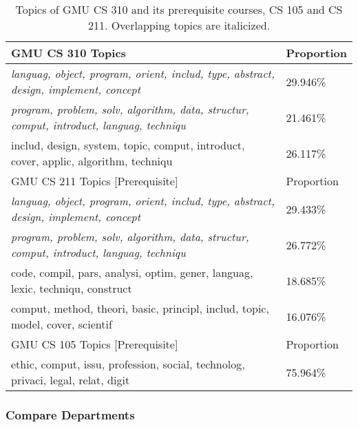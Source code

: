 \begin{table*}[ht!]
  \centering
  \begin{tabular}{ll}
    \toprule
    GMU CS 310 Topics & Proportion \\
    \midrule
    \emph{languag, object, program, orient, includ, type, abstract, design, implement, concept} & 29.946\% \\
    \emph{program, problem, solv, algorithm, data, structur, comput, introduct, languag, techniqu} & 21.461\% \\
    includ, design, system, topic, comput, introduct, cover, applic, algorithm, techniqu & 26.117\% \\
    \midrule
    GMU CS 211 Topics [Prerequisite] & Proportion \\
    \midrule
    \emph{languag, object, program, orient, includ, type, abstract, design, implement, concept} & 29.433\% \\
    \emph{program, problem, solv, algorithm, data, structur, comput, introduct, languag, techniqu} & 26.772\% \\
    code, compil, pars, analysi, optim, gener, languag, lexic, techniqu, construct & 18.685\% \\
    comput, method, theori, basic, principl, includ, topic, model, cover, scientif & 16.076\% \\
    \midrule
    GMU CS 105 Topics [Prerequisite] & Proportion \\
    \midrule
    ethic, comput, issu, profession, social, technolog, privaci, legal, relat, digit & 75.964\% \\
    \bottomrule
  \end{tabular}
  \caption{Topics of GMU CS 310 and its prerequisite courses, CS 105 and CS 211. Overlapping topics are italicized.\label{tbl:310-topics}}
\end{table*}


\subsubsection{Compare Departments}
\label{sec:vis-compare}


